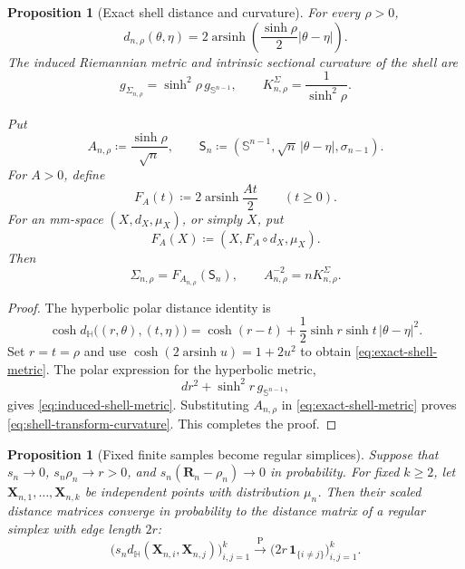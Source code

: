 \documentclass{amsart}
\numberwithin{equation}{section}
\theoremstyle{plain}
\newtheorem{prop}[thm]{Proposition}
\theoremstyle{definition}
\theoremstyle{remark}
\newcommand{\Hyp}{\mathbb{H}}
\newcommand{\Sph}{\mathbb{S}}
\DeclareMathOperator{\arsinh}{arsinh}
\begin{document}
\begin{prop}[Exact shell distance and curvature]\label{prop:shell-geometry}
	For every $\rho>0$,
	\begin{equation}\label{eq:exact-shell-metric}
		d_{n,\rho}(\theta,\eta)
		=
		2\arsinh\left(\frac{\sinh\rho}{2}|\theta-\eta|\right).
	\end{equation}
	The induced Riemannian metric and intrinsic sectional curvature of the
	shell are
	\begin{equation}\label{eq:induced-shell-metric}
		g_{\Sigma_{n,\rho}}
		=
		\sinh^2\rho\,g_{\Sph^{n-1}},
		\qquad
		K_{n,\rho}^{\Sigma}
		=
		\frac1{\sinh^2\rho}.
	\end{equation}

	Put
	\[
		A_{n,\rho}\coloneqq\frac{\sinh\rho}{\sqrt n},
		\qquad
		\mathsf S_n
		\coloneqq
		(\Sph^{n-1},\sqrt n\,|\theta-\eta|,\sigma_{n-1}).
	\]
	For $A>0$, define
\[ F_A(t)\coloneqq2\arsinh\frac{At}{2} \qquad(t\ge0). \]
	For an mm-space $(X,d_X,\mu_X)$, or simply $X$, put
	\[
		F_A(X)\coloneqq(X,F_A\circ d_X,\mu_X).
	\]
	Then
	\begin{equation}\label{eq:shell-transform-curvature}
		\Sigma_{n,\rho}=F_{A_{n,\rho}}(\mathsf S_n),
		\qquad
		A_{n,\rho}^{-2}=nK_{n,\rho}^{\Sigma}.
	\end{equation}
\end{prop}

\begin{proof}
	The hyperbolic polar distance identity is
	\begin{equation}\label{eq:hyperbolic-polar-distance}
		\cosh d_{\Hyp}\bigl((r,\theta),(t,\eta)\bigr)
		=
		\cosh(r-t)+\frac12\sinh r\sinh t\,|\theta-\eta|^2.
	\end{equation}
	Set $r=t=\rho$ and use
	$\cosh(2\arsinh u)=1+2u^2$ to obtain
	\eqref{eq:exact-shell-metric}.  The polar expression for the hyperbolic
	metric,
	\[
		dr^2+\sinh^2r\,g_{\Sph^{n-1}},
	\]
	gives \eqref{eq:induced-shell-metric}.  Substituting $A_{n,\rho}$ in
	\eqref{eq:exact-shell-metric} proves
	\eqref{eq:shell-transform-curvature}.  This completes the proof.
\end{proof}

\begin{prop}[Fixed finite samples become regular simplices]
\label{prop:equilateral}
	Suppose that $s_n\to0$, $s_n\rho_n\to r>0$, and
	$s_n(\mathbf R_n-\rho_n)\to0$ in probability.  For fixed $k\ge2$, let
	$\mathbf X_{n,1},\ldots,\mathbf X_{n,k}$ be independent points with
	distribution $\mu_n$.  Then their scaled distance matrices converge in
	probability to the distance matrix of a regular simplex with edge length
	$2r$:
	\[
		\bigl(s_nd_{\Hyp}(\mathbf X_{n,i},\mathbf X_{n,j})\bigr)_{i,j=1}^k
		\overset{\mathrm P}{\longrightarrow}
		\bigl(2r\,\boldsymbol{1}_{\{i\ne j\}}\bigr)_{i,j=1}^k.
	\]
\end{prop}
\end{document}
